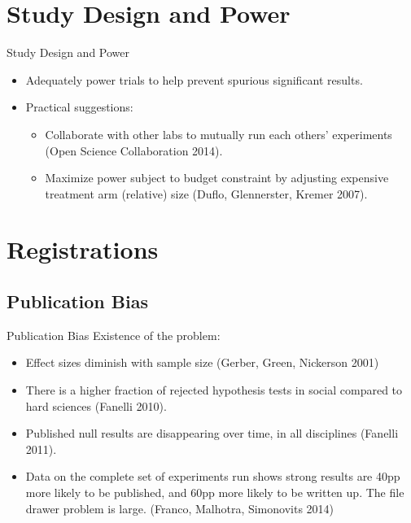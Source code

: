 \documentclass{beamer}
\begin{document}
\section{Study Design and Power}
\begin{frame}{Study Design and Power}
\begin{itemize}[<.->]
\item
Adequately power trials to help prevent spurious significant results. 
\item
Practical suggestions:
\begin{itemize}
\item
Collaborate with other labs to mutually run each others' experiments (Open Science Collaboration 2014).
\item
Maximize power subject to budget constraint by adjusting expensive treatment arm (relative) size (Duflo, Glennerster, Kremer 2007). 
\end{itemize}
\end{itemize}
\end{frame}

\section{Registrations}

\subsection*{Publication Bias}
\begin{frame}{Publication Bias}%
  Existence of the problem:
  \begin{itemize}[<.->]
  \item
 Effect sizes diminish with sample size (Gerber, Green, Nickerson 2001)
  \item
  There is a higher fraction of rejected hypothesis tests in social compared to hard sciences (Fanelli 2010).
  \item
  	Published null results are disappearing over time, in all disciplines (Fanelli 2011). 
  \item
  	Data on the complete set of experiments run shows strong results are 40pp more likely to be published, and 60pp more likely to be written up. The file drawer problem is large. (Franco, Malhotra, Simonovits 2014)
  \end{itemize}
\end{frame}
\end{document}
